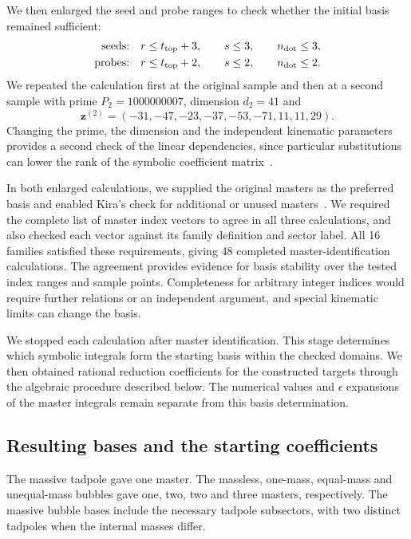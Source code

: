 \documentclass[11pt,a4paper]{article}
\begin{document}
We then enlarged the seed and probe ranges to check whether the
initial basis remained sufficient:
\begin{equation}
 \begin{aligned}
 \text{seeds:}\quad&
 r\leq t_{\rm top}+3,\qquad s\leq3,\qquad n_{\rm dot}\leq3,\\
 \text{probes:}\quad&
 r\leq t_{\rm top}+2,\qquad s\leq2,\qquad n_{\rm dot}\leq2.
 \end{aligned}
 \label{eq:master-expanded-bounds}
\end{equation}
We repeated the calculation first at the original sample and then
at a second sample with prime $P_2=1000000007$, dimension $d_2=41$
and
\begin{equation}
 \boldsymbol z^{(2)}=(-31,-47,-23,-37,-53,-71,11,11,29).
 \label{eq:master-second-sample}
\end{equation}
Changing the prime, the dimension and the independent kinematic
parameters provides a second check of the linear dependencies,
since particular substitutions can lower the rank of the
symbolic coefficient matrix~\cite{Kant}.

In both enlarged calculations, we supplied the original masters as
the preferred basis and enabled Kira's check for additional or
unused masters~\cite{Kira3}. We required the complete list of
master index vectors to agree in all three calculations, and
also checked each vector against its family definition and sector
label. All 16 families satisfied these requirements, giving
48 completed master-identification calculations. The agreement
provides evidence for basis stability over the tested index ranges
and sample points. Completeness for arbitrary integer indices
would require further relations or an independent argument, and
special kinematic limits can change the basis.

We stopped each calculation after master identification. This stage
determines which symbolic integrals form the starting basis within
the checked domains. We then obtained rational reduction coefficients
for the constructed targets through the algebraic procedure described
below. The numerical values and $\epsilon$ expansions of the
master integrals remain separate from this basis determination.

\subsection{Resulting bases and the starting coefficients}
The massive tadpole gave one master. The massless, one-mass,
equal-mass and unequal-mass bubbles gave one, two, two and three
masters, respectively. The massive bubble bases include the
necessary tadpole subsectors, with two distinct tadpoles when
the internal masses differ.
\end{document}
